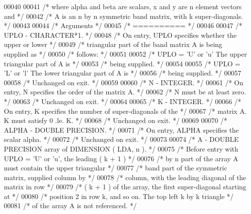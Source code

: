 \begin{DoxyCode}
00040 
00041 \textcolor{comment}{/*  where alpha and beta are scalars, x and y are n element vectors and */}
00042 \textcolor{comment}{/*  A is an n by n symmetric band matrix, with k super-diagonals. */}
00043 
00044 \textcolor{comment}{/*  Arguments */}
00045 \textcolor{comment}{/*  ========== */}
00046 
00047 \textcolor{comment}{/*  UPLO   - CHARACTER*1. */}
00048 \textcolor{comment}{/*           On entry, UPLO specifies whether the upper or lower */}
00049 \textcolor{comment}{/*           triangular part of the band matrix A is being supplied as */}
00050 \textcolor{comment}{/*           follows: */}
00051 
00052 \textcolor{comment}{/*              UPLO = 'U' or 'u'   The upper triangular part of A is */}
00053 \textcolor{comment}{/*                                  being supplied. */}
00054 
00055 \textcolor{comment}{/*              UPLO = 'L' or 'l'   The lower triangular part of A is */}
00056 \textcolor{comment}{/*                                  being supplied. */}
00057 
00058 \textcolor{comment}{/*           Unchanged on exit. */}
00059 
00060 \textcolor{comment}{/*  N      - INTEGER. */}
00061 \textcolor{comment}{/*           On entry, N specifies the order of the matrix A. */}
00062 \textcolor{comment}{/*           N must be at least zero. */}
00063 \textcolor{comment}{/*           Unchanged on exit. */}
00064 
00065 \textcolor{comment}{/*  K      - INTEGER. */}
00066 \textcolor{comment}{/*           On entry, K specifies the number of super-diagonals of the */}
00067 \textcolor{comment}{/*           matrix A. K must satisfy  0 .le. K. */}
00068 \textcolor{comment}{/*           Unchanged on exit. */}
00069 
00070 \textcolor{comment}{/*  ALPHA  - DOUBLE PRECISION. */}
00071 \textcolor{comment}{/*           On entry, ALPHA specifies the scalar alpha. */}
00072 \textcolor{comment}{/*           Unchanged on exit. */}
00073 
00074 \textcolor{comment}{/*  A      - DOUBLE PRECISION array of DIMENSION ( LDA, n ). */}
00075 \textcolor{comment}{/*           Before entry with UPLO = 'U' or 'u', the leading ( k + 1 ) */}
00076 \textcolor{comment}{/*           by n part of the array A must contain the upper triangular */}
00077 \textcolor{comment}{/*           band part of the symmetric matrix, supplied column by */}
00078 \textcolor{comment}{/*           column, with the leading diagonal of the matrix in row */}
00079 \textcolor{comment}{/*           ( k + 1 ) of the array, the first super-diagonal starting at */}
00080 \textcolor{comment}{/*           position 2 in row k, and so on. The top left k by k triangle */}
00081 \textcolor{comment}{/*           of the array A is not referenced. */}

\end{DoxyCode}
